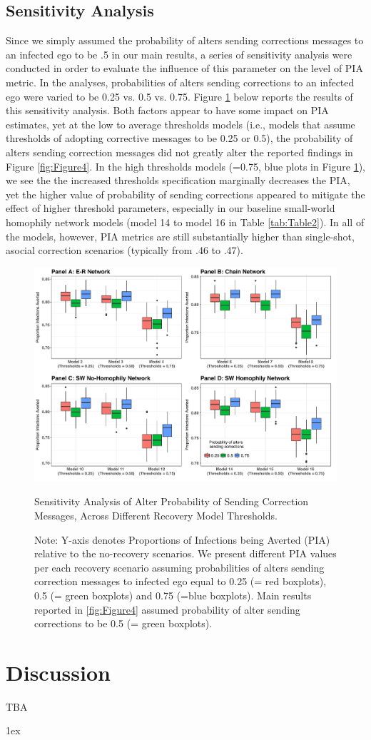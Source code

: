 \documentclass[man, 12pt, a4paper, nolmodern, noextraspace]{apa6}
\begin{document}
\subsection{Sensitivity Analysis}
  Since we simply assumed the probability of alters sending corrections messages to an infected ego to be .5 in our main results, a series of sensitivity analysis were conducted in order to evaluate the influence of this parameter on the level of PIA metric. In the analyses, probabilities of alters sending corrections to an infected ego were varied to be 0.25 vs. 0.5 vs. 0.75. Figure \ref{fig:Figure5} below reports the results of this sensitivity analysis. Both factors appear to have some impact on PIA estimates, yet at the low to average thresholds models (i.e., models that assume thresholds of adopting corrective messages to be 0.25 or 0.5), the probability of alters sending correction messages did not greatly alter the reported findings in Figure \ref{fig:Figure4}. In the high thresholds models (=0.75, blue plots in Figure \ref{fig:Figure5}), we see the the increased thresholds specification marginally decreases the PIA, yet the higher value of probability of sending corrections appeared to mitigate the effect of higher threshold parameters, especially in our baseline small-world homophily network models (model 14 to model 16 in Table \ref{tab:Table2}). In all of the models, however, PIA metrics are still substantially higher than single-shot, asocial correction scenarios (typically from .46 to .47).     
    
\begin{figure}
    \centering
        \includegraphics[clip, width=0.9\linewidth, height=0.55\textwidth]{draft/Fig5.pdf} 

    \captionsetup{format=hang}
    \caption{Sensitivity Analysis of Alter Probability of Sending Correction Messages, Across Different Recovery Model Thresholds.} 
    \label{fig:Figure5}
    \captionsetup{font=small}
    \caption*{Note: Y-axis denotes Proportions of Infections being Averted (PIA) relative to the no-recovery scenarios. We present different PIA values per each recovery scenario assuming probabilities of alters sending correction messages to infected ego equal to 0.25 (= red boxplots), 0.5 (= green boxplots) and 0.75 (=blue boxplots). Main results reported in \ref{fig:Figure4} assumed probability of alter sending corrections to be 0.5 (= green boxplots).} 
\end{figure}    
  
\section{Discussion}
  TBA

\printbibliography
\newpage
\begingroup
\parindent 0pt
\parskip 1ex
\def\enotesize{\normalsize}
\theendnotes
\endgroup
\end{document}

